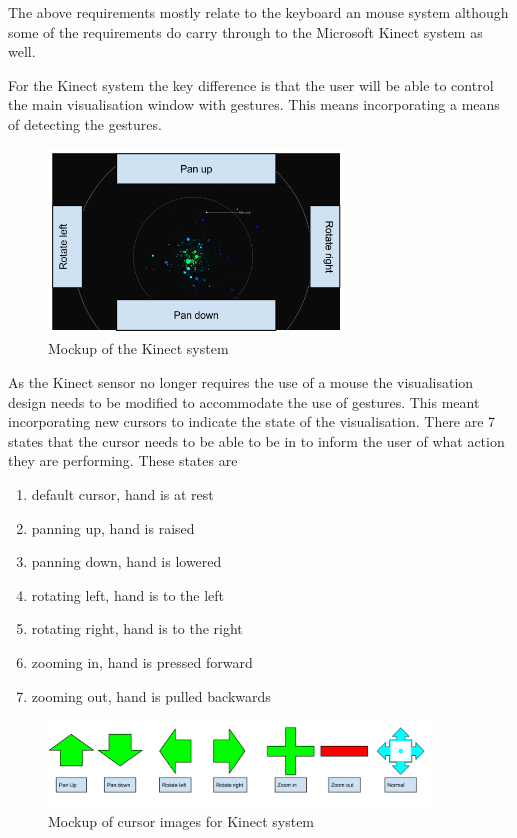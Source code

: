 \begin{enumerate}
The above requirements mostly relate to the keyboard an mouse system although some of the requirements do carry through to the Microsoft Kinect system as well. 

For the Kinect system the key difference is that the user will be able to control the main visualisation window with gestures. This means incorporating a means of detecting the gestures. 
\begin{figure}[H]
  \centering
      \includegraphics[width=0.7\textwidth]{images/mockKinect.png}
  \caption{Mockup of the Kinect system}  
\end{figure}

As the Kinect sensor no longer requires the use of a mouse the visualisation
design needs to be modified to accommodate the use of gestures. This meant incorporating new cursors to indicate the state of the visualisation.
There are 7 states that the cursor needs to be able to be in to inform the user
of what action they are performing. These states are

\begin{enumerate}
 \item default cursor, hand is at rest
 \item panning up, hand is raised
 \item panning down, hand is lowered
 \item rotating left, hand is to the left
 \item rotating right, hand is to the right
 \item zooming in, hand is pressed forward
 \item zooming out, hand is pulled backwards
\end{enumerate}
\begin{figure}[H]
  \centering
      \includegraphics[width=0.9\textwidth]{images/curserImages.png}
  \caption{Mockup of cursor images for Kinect system}  
\end{figure}


\end{enumerate}
